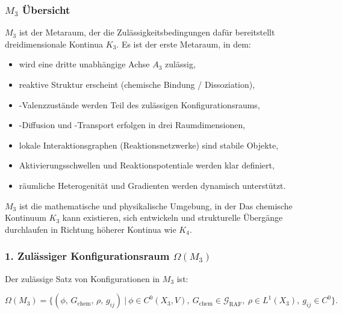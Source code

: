 

\subsubsection{\texorpdfstring{$M_3$}{M_3} Übersicht}
\label{sec:m3-overview}

$M_3$ ist der Metaraum, der die Zulässigkeitsbedingungen dafür bereitstellt
dreidimensionale Kontinua $K_3$.
Es ist der erste Metaraum, in dem:

\begin{itemize}
    \item wird eine dritte unabhängige Achse $A_3$ zulässig,
    \item reaktive Struktur erscheint (chemische Bindung / Dissoziation),
    \item-Valenzzustände werden Teil des zulässigen Konfigurationsraums,
    \item-Diffusion und -Transport erfolgen in drei Raumdimensionen,
    \item lokale Interaktionsgraphen (Reaktionsnetzwerke) sind stabile Objekte,
    \item Aktivierungsschwellen und Reaktionspotentiale werden klar definiert,
    \item räumliche Heterogenität und Gradienten werden dynamisch unterstützt.
\end{itemize}

$M_3$ ist die mathematische und physikalische Umgebung, in der
Das chemische Kontinuum $K_3$ kann existieren, sich entwickeln und strukturelle Übergänge durchlaufen
in Richtung höherer Kontinua wie $K_4$.

\subsubsection*{1. Zulässiger Konfigurationsraum \texorpdfstring{$\Omega(M_3)$}{\Omega(M_3)}}

Der zulässige Satz von Konfigurationen in $M_3$ ist:

\[
\Omega(M_3)
=
\Big\{
(\phi,\, G_{\mathrm{chem}},\, \rho,\, g_{ij}) \ \Big|\
\phi \in C^{0}(X_3, V),\
G_{\mathrm{chem}} \in \mathcal{G}_{\mathrm{RAF}},\
\rho \in L^1(X_3),\
g_{ij}\in C^{0}
\Big\}.
\]

